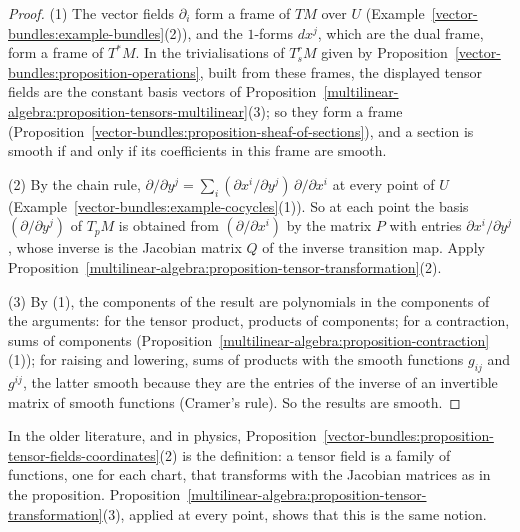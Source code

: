 \begin{proof}
(1) The vector fields $\partial_i$ form a frame of $TM$ over $U$ (Example~\ref{vector-bundles:example-bundles}(2)), and the $1$-forms $dx^j$, which are the dual frame, form a frame of
$T^*M$. In the trivialisations of $T^r_sM$ given by Proposition~\ref{vector-bundles:proposition-operations}, built from these frames, the displayed tensor fields are the constant
basis vectors of Proposition~\ref{multilinear-algebra:proposition-tensors-multilinear}(3); so they form a frame (Proposition~\ref{vector-bundles:proposition-sheaf-of-sections}), and a section is
smooth if and only if its coefficients in this frame are smooth.

(2) By the chain rule, $\partial/\partial y^j = \sum_i(\partial x^i/\partial y^j)\,\partial/\partial x^i$ at every point of $U$
(Example~\ref{vector-bundles:example-cocycles}(1)). So at each point the basis $(\partial/\partial y^j)$ of $T_pM$ is obtained from $(\partial/\partial x^i)$ by the matrix $P$ with entries
$\partial x^i/\partial y^j$, whose inverse is the Jacobian matrix $Q$ of the inverse transition map. Apply Proposition~\ref{multilinear-algebra:proposition-tensor-transformation}(2).

(3) By (1), the components of the result are polynomials in the components of the arguments: for the tensor product, products of components; for a contraction, sums of components
(Proposition~\ref{multilinear-algebra:proposition-contraction}(1)); for raising and lowering, sums of products with the smooth functions $g_{ij}$ and $g^{ij}$, the latter smooth because they are
the entries of the inverse of an invertible matrix of smooth functions (Cramer's rule). So the results are smooth.
\end{proof}

In the older literature, and in physics, Proposition~\ref{vector-bundles:proposition-tensor-fields-coordinates}(2) is the definition: a tensor field is a family of functions, one for each
chart, that transforms with the Jacobian matrices as in the proposition. Proposition~\ref{multilinear-algebra:proposition-tensor-transformation}(3), applied at every point, shows that this is the same
notion.

